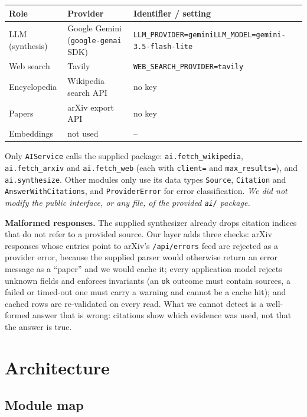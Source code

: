 \documentclass[11pt,a4paper]{article}
\newcommand{\cmd}[1]{\texttt{#1}}
\begin{document}
\begin{center}\small
\begin{tabularx}{\textwidth}{@{}llX@{}}
\toprule
\textbf{Role} & \textbf{Provider} & \textbf{Identifier / setting} \\
\midrule
LLM (synthesis) & Google Gemini (\texttt{google-genai} SDK) & \cmd{LLM\_PROVIDER=gemini}\newline\cmd{LLM\_MODEL=gemini-3.5-flash-lite} \\
Web search & Tavily & \cmd{WEB\_SEARCH\_PROVIDER=tavily} \\
Encyclopedia & Wikipedia search API & no key \\
Papers & arXiv export API & no key \\
Embeddings & not used & -- \\
\bottomrule
\end{tabularx}
\end{center}

Only \texttt{AIService} calls the supplied package: \cmd{ai.fetch\_wikipedia},
\cmd{ai.fetch\_arxiv} and \cmd{ai.fetch\_web} (each with \cmd{client=} and
\cmd{max\_results=}), and \cmd{ai.synthesize}. Other modules only use its data
types \cmd{Source}, \cmd{Citation} and \cmd{AnswerWithCitations}, and
\cmd{ProviderError} for error classification. \emph{We did not modify the public
interface, or any file, of the provided \texttt{ai/} package.}

\textbf{Malformed responses.} The supplied synthesizer already drops citation
indices that do not refer to a provided source. Our layer adds three checks:
arXiv responses whose entries point to arXiv's \cmd{/api/errors} feed are
rejected as a provider error, because the supplied parser would otherwise
return an error message as a ``paper'' and we would cache it; every application
model rejects unknown fields and enforces invariants (an \cmd{ok} outcome must
contain sources, a failed or timed-out one must carry a warning and cannot be a
cache hit); and cached rows are re-validated on every read. What we cannot
detect is a well-formed answer that is wrong: citations show which evidence was
used, not that the answer is true.

\section{Architecture}\label{sec:arch}

\subsection{Module map}
\end{document}
